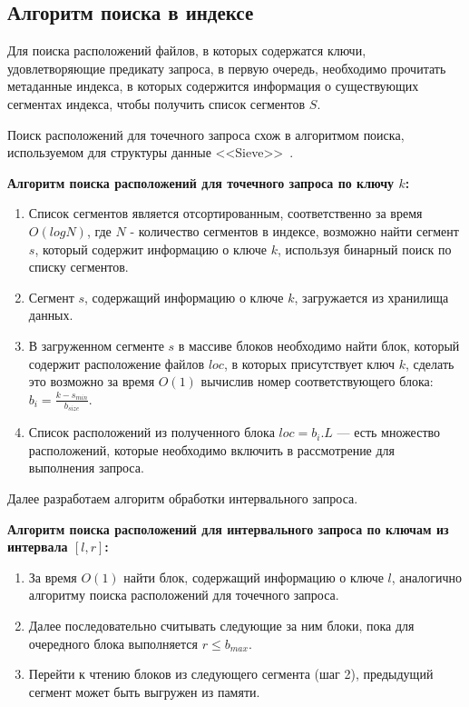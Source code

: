 \subsection{Алгоритм поиска в индексе}\label{search}

Для поиска расположений файлов, в которых содержатся ключи, удовлетворяющие предикату запроса, в первую очередь, необходимо прочитать метаданные индекса, в которых содержится информация о существующих сегментах индекса, чтобы получить список сегментов $S$.

Поиск расположений для точечного запроса схож в алгоритмом поиска, используемом для структуры данные {<<Sieve>>}~\cite{Sieve}.

\textbf{Алгоритм поиска расположений для точечного запроса по ключу $k$:}
\begin{enumerate}
    \item Список сегментов является отсортированным, соответственно за время $O(logN)$, где $N$ - количество сегментов в индексе, возможно найти сегмент $s$, который содержит информацию о ключе $k$, используя бинарный поиск по списку сегментов.
    \item Сегмент $s$, содержащий информацию о ключе $k$, загружается из хранилища данных.
    \item В загруженном сегменте $s$ в массиве блоков необходимо найти блок, который содержит расположение файлов $loc$, в которых присутствует ключ $k$, сделать это возможно за время $O(1)$ вычислив номер соответствующего блока: $b_{i} = \frac{k - s_{min}}{b_{size}}$.
    \item Список расположений из полученного блока $loc = b_{i}.L$ --- есть множество расположений, которые необходимо включить в рассмотрение для выполнения запроса.
\end{enumerate}

Далее разработаем алгоритм обработки интервального запроса.

\textbf{Алгоритм поиска расположений для интервального запроса по ключам из интервала $[l, r]$:}
\begin{enumerate}
    \item За время $O(1)$ найти блок, содержащий информацию о ключе $l$, аналогично алгоритму поиска расположений для точечного запроса.
    \item Далее последовательно считывать следующие за ним блоки, пока для очередного блока выполняется $r \leq b_{max}$.
    \item Перейти к чтению блоков из следующего сегмента (шаг 2), предыдущий сегмент может быть выгружен из памяти.
\end{enumerate}
